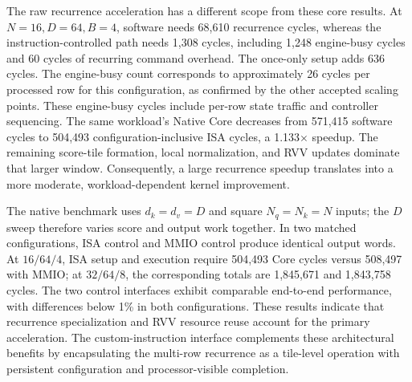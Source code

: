 \documentclass[journal]{IEEEtran}
\begin{document}
The raw recurrence acceleration has a different scope from these core
results. At $N=16,D=64,B=4$, software needs 68,610 recurrence cycles,
whereas the instruction-controlled path needs 1,308 cycles, including
1,248 engine-busy cycles and 60 cycles of recurring command overhead.
The once-only setup adds 636 cycles. The engine-busy count corresponds
to approximately 26 cycles per processed row for this configuration, as
confirmed by the other accepted scaling points. These engine-busy cycles include per-row state traffic and controller
sequencing. The same workload's Native Core decreases from 571,415 software cycles to
504,493 configuration-inclusive ISA cycles, a 1.133$\times$ speedup.
The remaining score-tile formation, local normalization, and RVV updates
dominate that larger window. Consequently, a large recurrence speedup
translates into a more moderate, workload-dependent kernel improvement.

The native benchmark uses $d_k=d_v=D$ and square $N_q=N_k=N$ inputs; the
$D$ sweep therefore varies score and output work together. In two matched configurations, ISA control
and MMIO control produce identical output words. At $16/64/4$, ISA setup
and execution require 504,493 Core cycles versus 508,497 with MMIO; at
$32/64/8$, the corresponding totals are 1,845,671 and 1,843,758 cycles.
The two control interfaces exhibit comparable end-to-end performance, with
differences below 1\% in both configurations. These results indicate that
recurrence specialization and RVV resource reuse account for the primary
acceleration. The custom-instruction interface complements these
architectural benefits by encapsulating the multi-row recurrence as a tile-level
operation with persistent configuration and processor-visible completion.
\end{document}
